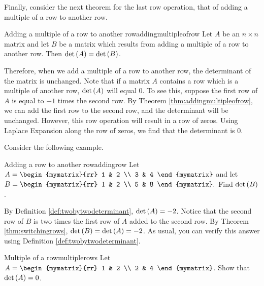 Finally, consider the next theorem for the last row operation, that of adding a multiple of a row
to another row. 

\begin{theorem}{Adding a multiple of a row to another row}{addingmultipleofrow}
Let $A$ be an $n\times n$ matrix and let $B$ be a matrix
which results from adding a multiple of a row to another row.
 Then $\det \left(A\right) =\det
\left(B \right) $.
\end{theorem}

Therefore, when we add a multiple of a row to another row, the determinant of the matrix is unchanged. 
Note that if a matrix $A$ contains a row which is a multiple of another row, $\det \left(A\right)$ will equal $0$. To see this,
suppose the first row of $A$ is equal to $-1$ times the second row. By Theorem \ref{thm:addingmultipleofrow}, we can 
add the first row to the second row, and the determinant will be unchanged. However, this row operation will result in a row of zeros.
Using Laplace Expansion along the row of zeros, we find that the determinant is $0$. 

Consider the following example.

\begin{example}{Adding a row to another row}{addingrow}
Let $A=\begin{mymatrix}{rr}
1 & 2 \\
3 & 4
\end{mymatrix} $ and let $B=\begin{mymatrix}{rr}
1 & 2 \\
5 & 8
\end{mymatrix} .$ 
Find $\det \left(B\right)$.
\end{example}

\begin{solution}
By Definition \ref{def:twobytwodeterminant}, $\det \left(A\right) = -2$. 
Notice that the second row of $B$ is two times the first row of $A$ added
to the second row. 
By Theorem \ref{thm:switchingrows}, $\det \left(B\right) = \det \left(A \right)
=-2$.
As usual, you can verify this answer using Definition \ref{def:twobytwodeterminant}.
\end{solution}

\begin{example}{Multiple of a row}{multiplerows}
Let $A = \begin{mymatrix}{rr}
1 & 2 \\
2 & 4 
\end{mymatrix}$. Show that $\det \left(A \right) = 0$. 
\end{example}

